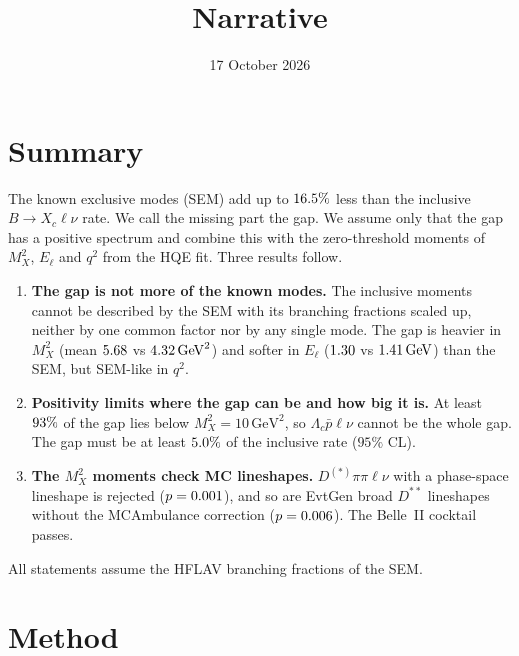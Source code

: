 \documentclass[11pt]{article}
\title{Narrative}
\author{}
\date{17 October 2026}
\newcommand{\GeV}{\,\mathrm{GeV}}
\newcommand{\Mx}{M_X^2}
\newcommand{\El}{E_\ell}
\newcommand{\Lcp}{\Lambda_c\bar p}
\begin{document}
\maketitle
\vspace{-1.5em}

\section*{Summary}
The known exclusive modes (SEM) add up to $16.5\%$ less than the inclusive $B\to X_c\ell\nu$ rate. We call the
missing part the gap. We assume only that the gap has a positive spectrum and combine this with the zero-threshold
moments of $\Mx$, $\El$ and $q^2$ from the HQE fit. Three results follow.
\begin{enumerate}
\item \textbf{The gap is not more of the known modes.} The inclusive moments cannot be described by the SEM with its
  branching fractions scaled up, neither by one common factor nor by any single mode. The gap is heavier in $\Mx$ (mean
  $5.68$ vs $\nSemMeanMx\GeV^2$) and softer in $\El$ ($1.30$ vs $\nSemMeanEl\GeV$) than the SEM, but
  SEM-like in $q^2$.
\item \textbf{Positivity limits where the gap can be and how big it is.} At least $93\%$ of the gap lies
  below $\Mx = 10\GeV^2$, so $\Lcp\ell\nu$ cannot be the whole gap. The gap must be at least $5.0\%$ of the
  inclusive rate ($95\%$ CL).
\item \textbf{The $\Mx$ moments check MC lineshapes.} $D^{(*)}\pi\pi\ell\nu$ with a phase-space lineshape is rejected
  ($p = 0.001$), and so are EvtGen broad $D^{**}$ lineshapes without the MCAmbulance correction ($p = 0.006$). The
  Belle~II cocktail passes.
\end{enumerate}
All statements assume the HFLAV branching fractions of the SEM.

\section{Method}

\FloatBarrier
\end{document}

